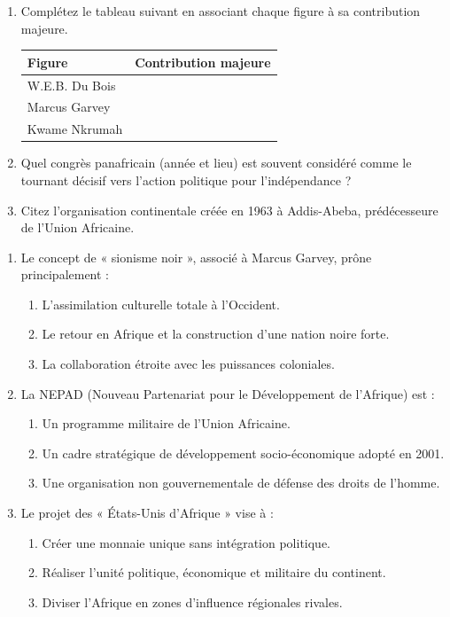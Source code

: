 \documentclass[11pt]{article}
\begin{document}
\begin{exercice}
\begin{enumerate}
    \item Complétez le tableau suivant en associant chaque figure à sa contribution majeure.
    \begin{tabular}{|l|l|}
    \hline
    \textbf{Figure} & \textbf{Contribution majeure} \\ \hline
    W.E.B. Du Bois & \\ \hline
    Marcus Garvey & \\ \hline
    Kwame Nkrumah & \\ \hline
    \end{tabular}
    \item Quel congrès panafricain (année et lieu) est souvent considéré comme le tournant décisif vers l'action politique pour l'indépendance ?
    \item Citez l'organisation continentale créée en 1963 à Addis-Abeba, prédécesseure de l'Union Africaine.
\end{enumerate}
\end{exercice}

\begin{exercice}
\begin{enumerate}
    \item Le concept de « sionisme noir », associé à Marcus Garvey, prône principalement :
    \begin{enumerate}
        \item L'assimilation culturelle totale à l'Occident.
        \item Le retour en Afrique et la construction d'une nation noire forte.
        \item La collaboration étroite avec les puissances coloniales.
    \end{enumerate}
    \item La NEPAD (Nouveau Partenariat pour le Développement de l'Afrique) est :
    \begin{enumerate}
        \item Un programme militaire de l'Union Africaine.
        \item Un cadre stratégique de développement socio-économique adopté en 2001.
        \item Une organisation non gouvernementale de défense des droits de l'homme.
    \end{enumerate}
    \item Le projet des « États-Unis d'Afrique » vise à :
    \begin{enumerate}
        \item Créer une monnaie unique sans intégration politique.
        \item Réaliser l'unité politique, économique et militaire du continent.
        \item Diviser l'Afrique en zones d'influence régionales rivales.
    \end{enumerate}
\end{enumerate}
\end{exercice}
\end{document}
